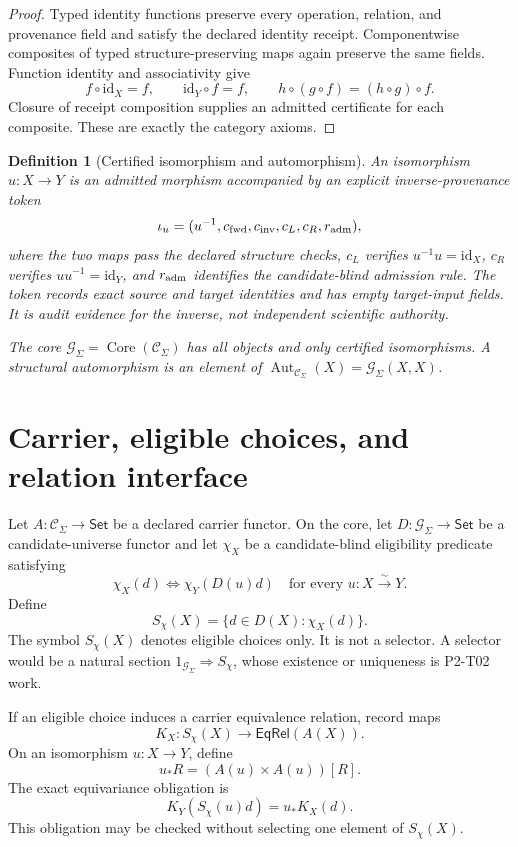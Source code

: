 \documentclass[11pt]{article}
\newtheorem{definition}{Definition}
\newcommand{\Core}{\operatorname{Core}}
\newcommand{\Aut}{\operatorname{Aut}}
\newcommand{\EqRel}{\mathsf{EqRel}}
\newcommand{\Set}{\mathsf{Set}}
\begin{document}
\begin{proof}
Typed identity functions preserve every operation, relation, and provenance
field and satisfy the declared identity receipt. Componentwise composites of
typed structure-preserving maps again preserve the same fields. Function
identity and associativity give
\[
f\circ\mathrm{id}_X=f,\qquad
\mathrm{id}_Y\circ f=f,\qquad
h\circ(g\circ f)=(h\circ g)\circ f.
\]
Closure of receipt composition supplies an admitted certificate for each
composite. These are exactly the category axioms.
\end{proof}

\begin{definition}[Certified isomorphism and automorphism]
An isomorphism \(u:X\to Y\) is an admitted morphism accompanied by an explicit
inverse-provenance token
\[
\iota_u=(u^{-1},c_{\rm fwd},c_{\rm inv},c_L,c_R,r_{\rm adm}),
\]
where the two maps pass the declared structure checks,
\(c_L\) verifies \(u^{-1}u=\mathrm{id}_X\), \(c_R\) verifies
\(uu^{-1}=\mathrm{id}_Y\), and \(r_{\rm adm}\) identifies the candidate-blind
admission rule. The token records exact source and target identities and has
empty target-input fields. It is audit evidence for the inverse, not
independent scientific authority.

The core \(\mathcal G_{\Sigma}=\Core(\mathcal C_{\Sigma})\) has all objects and
only certified isomorphisms. A structural automorphism is an element of
\(\Aut_{\mathcal C_{\Sigma}}(X)=\mathcal G_{\Sigma}(X,X)\).
\end{definition}

\section{Carrier, eligible choices, and relation interface}

Let \(A:\mathcal C_{\Sigma}\to\Set\) be a declared carrier functor. On the
core, let \(D:\mathcal G_{\Sigma}\to\Set\) be a candidate-universe functor and
let \(\chi_X\) be a candidate-blind eligibility predicate satisfying
\[
\chi_X(d)\Longleftrightarrow
\chi_Y(D(u)d)
\quad\text{for every }u:X\overset{\sim}{\longrightarrow}Y.
\]
Define
\[
S_{\chi}(X)=\{d\in D(X):\chi_X(d)\}.
\]
The symbol \(S_{\chi}(X)\) denotes eligible choices only. It is not a
selector. A selector would be a natural section
\(1_{\mathcal G_{\Sigma}}\Rightarrow S_{\chi}\), whose existence or uniqueness
is P2-T02 work.

If an eligible choice induces a carrier equivalence relation, record maps
\[
K_X:S_{\chi}(X)\longrightarrow\EqRel(A(X)).
\]
On an isomorphism \(u:X\to Y\), define
\[
u_*R=(A(u)\times A(u))[R].
\]
The exact equivariance obligation is
\[
K_Y(S_{\chi}(u)d)=u_*K_X(d).
\]
This obligation may be checked without selecting one element of
\(S_{\chi}(X)\).
\end{document}
